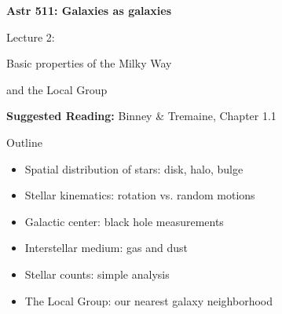 \documentclass[letterpaper,landscape]{slides}
\begin{document}

\begin{slide}

\phantom{x}
\vskip -2in
\begin{center}
\bfseries
{\large {\color{blue} Astr 511: Galaxies as galaxies}}
\end{center}



\vskip 0.4in

{\centerline {\huge {\color{red}      Lecture 2:             }}}
\vskip 0.2in 
{\centerline {\Large {\color{blue} Basic properties of the Milky Way }}}
{\centerline {\Large {\color{blue} and the Local Group  }}}
\vskip 0.2in 
{\centerline {{\bf Suggested Reading:} Binney \& Tremaine, Chapter 1.1  }}

\vfill
\end{slide}


\begin{slide}
\begin{center}
{\large \color{red} 
                         Outline
}
\end{center}

\begin{itemize}
\item {\color{blue} Spatial distribution of stars:} disk, halo, bulge
\item {\color{blue} Stellar kinematics:} rotation vs. random motions
\item {\color{blue} Galactic center:} black hole measurements
\item {\color{blue} Interstellar medium:} gas and dust
\item {\color{blue} Stellar counts:} simple analysis
\item {\color{blue} The Local Group:} our nearest galaxy neighborhood 

\end{itemize}          


\vfill
\end{slide}
\end{document}

